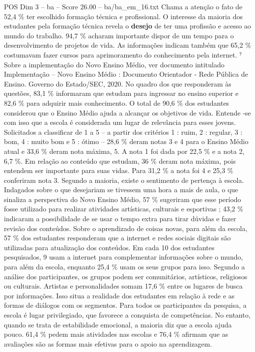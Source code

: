 \begin{textsample}{POS Dim 3 – ba – Score 26.00 – ba/ba\_em\_16.txt}
Chama a atenção o fato de 52,4 \% ter escolhido formação técnica e profissional.
O interesse da maioria dos estudantes pela formação técnica revela o \textbf{desejo} de ter uma profissão e acesso ao mundo do trabalho. 94,7 \% acharam importante dispor de um tempo para o desenvolvimento de projetos de vida.
As informações indicam também que 65,2 \% costumavam fazer cursos para aprimoramento do conhecimento pela internet. ⁷ Sobre a implementação do Novo Ensino Médio, ver documento intitulado Implementação – Novo Ensino Médio : Documento Orientador - Rede Pública de Ensino.
Governo do Estado/SEC, 2020.
No quadro dos que responderam às questões, 83,1 \% informaram que estudam para ingressar no ensino superior e 82,6 \% para adquirir mais conhecimento.
O total de 90,6 \% dos estudantes considerou que o Ensino Médio ajuda a alcançar os objetivos de vida.
Entende -se com isso que a escola é considerada um lugar de relevância para esses jovens.
Solicitados a classificar de 1 a 5 – a partir dos critérios 1 : ruim, 2 : regular, 3 : bom, 4 : muito bom e 5 : ótimo – 28,6 \% deram notas 3 e 4 para o Ensino Médio atual e 33,6 \% deram nota máxima, 5.
A nota 1 foi dada por 22,5 \% e a nota 2, 6,7 \%.
Em relação ao conteúdo que estudam, 36 \% deram nota máxima, pois entendem ser importante para suas vidas.
Para 31,2 \% a nota foi 4 e 25,3 \% conferiram nota 3.
Segundo a maioria, existe o sentimento de pertença à escola.
Indagados sobre o que desejariam se tivessem uma hora a mais de aula, o que sinaliza a perspectiva do Novo Ensino Médio, 57 \% sugeriram que esse período fosse utilizado para realizar atividades artísticas, culturais e esportivas ; 43,2 \% indicaram a possibilidade de se usar o tempo extra para tirar dúvidas e fazer revisão dos conteúdos.
Sobre o aprendizado de coisas novas, para além da escola, 57 \% dos estudantes responderam que a internet e redes sociais digitais são utilizadas para atualização dos conteúdos.
Em cada 10 dos estudantes pesquisados, 9 usam a internet para complementar informações sobre o mundo, para além da escola, enquanto 25,4 \% usam os seus grupos para isso.
Segundo a análise dos participantes, os grupos podem ser comunitários, artísticos, religiosos ou culturais.
Artistas e personalidades somam 17,6 \% entre os lugares de busca por informações.
Isso situa a realidade dos estudantes em relação à rede e as formas de diálogos com os segmentos.
Para todos os participantes da pesquisa, a escola é lugar privilegiado, que favorece a conquista de competências.
No entanto, quando se trata de estabilidade emocional, a maioria diz que a escola ajuda pouco. 61,4 \% pedem mais atividades nas escolas e 76,4 \% afirmam que as avaliações são as formas mais efetivas para o apoio na aprendizagem.

\end{textsample}
